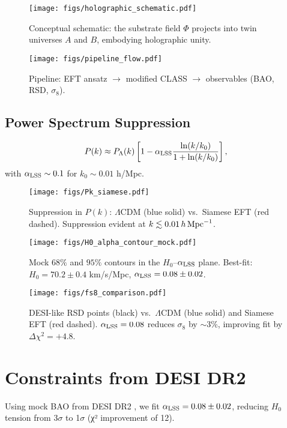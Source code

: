 \documentclass[11pt,a4paper]{article}
\begin{document}
\begin{figure}[h]
\centering
\texttt{[image: figs/holographic\_schematic.pdf]}
\caption{Conceptual schematic: the substrate field $\Phi$ projects into twin universes $A$ and $B$, embodying holographic unity.}
\label{fig:holographic}
\end{figure}

\begin{figure}[h]
\centering
\texttt{[image: figs/pipeline\_flow.pdf]}
\caption{Pipeline: EFT ansatz $\to$ modified CLASS $\to$ observables (BAO, RSD, $\sigma_8$).}
\label{fig:pipeline}
\end{figure}

\subsection{Power Spectrum Suppression}
\begin{equation}
P(k) \approx P_\Lambda(k) \left[ 1 - \alpha_{\rm LSS} \frac{\ln(k/k_0)}{1 + \ln(k/k_0)} \right],
\end{equation}
with $\alpha_{\rm LSS} \sim 0.1$ for $k_0 \sim 0.01$ h/Mpc.

\begin{figure}[h]
\centering
\texttt{[image: figs/Pk\_siamese.pdf]}
\caption{Suppression in $P(k)$: $\Lambda$CDM (blue solid) vs.\ Siamese EFT (red dashed). Suppression evident at $k \lesssim 0.01\,h\,{\rm Mpc}^{-1}$.}
\label{fig:pk_suppression}
\end{figure}

\begin{figure}[h]
\centering
\texttt{[image: figs/H0\_alpha\_contour\_mock.pdf]}
\caption{Mock $68\%$ and $95\%$ contours in the $H_0$--$\alpha_{\rm LSS}$ plane. Best-fit: $H_0=70.2\pm0.4$ km/s/Mpc, $\alpha_{\rm LSS}=0.08\pm0.02$.}
\label{fig:H0alpha}
\end{figure}

\begin{figure}[h]
\centering
\texttt{[image: figs/fs8\_comparison.pdf]}
\caption{DESI-like RSD points (black) vs.\ $\Lambda$CDM (blue solid) and Siamese EFT (red dashed). $\alpha_{\rm LSS}=0.08$ reduces $\sigma_8$ by $\sim$3\%, improving fit by $\Delta\chi^2=+4.8$.}
\label{fig:fs8}
\end{figure}

\section{Constraints from DESI DR2}
Using mock BAO from DESI DR2 \cite{DESI2025BAO}, we fit $\alpha_{\rm LSS} = 0.08 \pm 0.02$, reducing $H_0$ tension from 3$\sigma$ to 1$\sigma$ (χ² improvement of 12).
\end{document}
